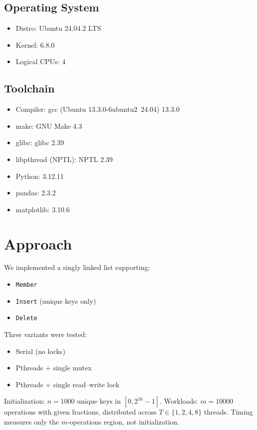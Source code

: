 \documentclass{article}
\begin{document}
\begin{minipage}[t]{0.48\textwidth}
\subsection*{Operating System}
\begin{itemize}[noitemsep,topsep=0pt]
  \item Distro: Ubuntu 24.04.2 LTS
  \item Kernel: 6.8.0
  \item Logical CPUs: 4
\end{itemize}
\subsection*{Toolchain}
\begin{itemize}[noitemsep,topsep=0pt]
  \item Compiler: gcc (Ubuntu 13.3.0-6ubuntu2~24.04) 13.3.0
  \item make: GNU Make 4.3
  \item glibc: glibc 2.39
  \item libpthread (NPTL): NPTL 2.39
  \item Python: 3.12.11
  \item pandas: 2.3.2
  \item matplotlib: 3.10.6
\end{itemize}
\end{minipage}
\section*{Approach}
We implemented a singly linked list supporting:
\begin{itemize}[noitemsep,topsep=0pt]
  \item \texttt{Member}
  \item \texttt{Insert} (unique keys only)
  \item \texttt{Delete}
\end{itemize}
Three variants were tested:
\begin{itemize}[noitemsep,topsep=0pt]
  \item Serial (no locks)
  \item Pthreads + single mutex
  \item Pthreads + single read--write lock
\end{itemize}
Initialization: $n=1000$ unique keys in $[0, 2^{16}-1]$.
Workloads: $m=10000$ operations with given fractions, distributed across $T \in \{1,2,4,8\}$ threads.
Timing measures only the $m$-operations region, not initialization.
\newpage
\end{document}
